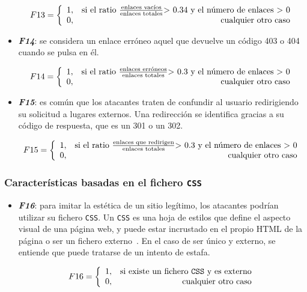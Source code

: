 \begin{itemize}
	\[F13 = \left\{ \begin{array}{lr} 1, & \text{si el ratio } \frac{\text{enlaces vacíos}}{\text{enlaces totales}} \text{> 0.34 y el número de enlaces > 0} \\
	0, & \text{\raggedright cualquier otro caso} \label{eqn:phishing_f13} \end{array}\right.\]

	\item \textit{\textbf{F14}}: se considera un enlace erróneo aquel que devuelve un código 403 o 404 cuando se pulsa en él.

	\[F14 = \left\{ \begin{array}{lr} 1, & \text{si el ratio } \frac{\text{enlaces erróneos}}{\text{enlaces totales}} \text{> 0.3 y el número de enlaces > 0} \\
	0, & \text{\raggedright cualquier otro caso} \label{eqn:phishing_f14} \end{array}\right.\]

	\item \textit{\textbf{F15}}: es común que los atacantes traten de confundir al usuario redirigiendo su solicitud a lugares externos. Una redirección se identifica gracias a su código de respuesta, que es un 301 o un 302.

	\[F15 = \left\{ \begin{array}{lr} 1, & \text{si el ratio } \frac{\text{enlaces que redirigen}}{\text{enlaces totales}} \text{> 0.3 y el número de enlaces > 0} \\
	0, & \text{\raggedright cualquier otro caso} \label{eqn:phishing_f15} \end{array}\right.\]
\end{itemize}


\subsubsection{Características basadas en el fichero \texttt{CSS}}

\begin{itemize}
	\item \textit{\textbf{F16}}: para imitar la estética de un sitio legítimo, los atacantes podrían utilizar su fichero \texttt{CSS}. Un \texttt{CSS} es una hoja de estilos que define el aspecto visual de una página web, y puede estar incrustado en el propio HTML de la página o ser un fichero externo~\cite{cssExternos}. En el caso de ser único y externo, se entiende que puede tratarse de un intento de estafa.

	\[F16 = \left\{ \begin{array}{lr} 1, & \text{si existe un fichero \texttt{CSS} y es externo}\\
	0, & \text{\raggedright cualquier otro caso} \label{eqn:phishing_f16} \end{array}\right.\]
\end{itemize}


